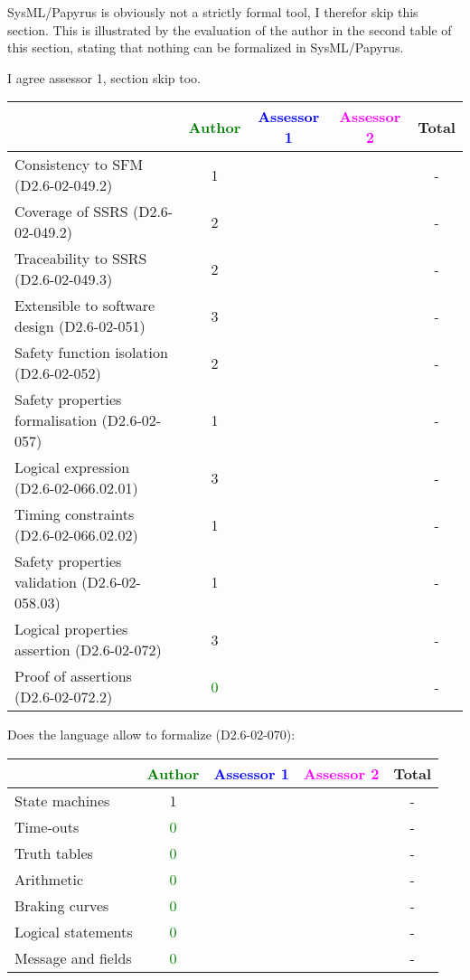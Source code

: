 \begin{assessor1}
SysML/Papyrus is obviously not a strictly formal tool, I therefor skip this section. 
This is illustrated by the evaluation of the author in the second table of this section, stating that nothing can be formalized in SysML/Papyrus. 
\end{assessor1}


\begin{assessor2}
I agree assessor 1, section skip too.
\end{assessor2}

\begin{tabular}{|l | c | c | c | c|}
\hline
& \textcolor{green}{Author} & \textcolor{blue}{Assessor 1} & \textcolor{magenta}{Assessor 2} & Total \\
\hline
Consistency to SFM (D2.6-02-049.2) & 1     & & & - \\
\hline
Coverage of SSRS (D2.6-02-049.2) & 2     & & & - \\
\hline
Traceability to SSRS (D2.6-02-049.3) & 2     && & - \\
\hline
Extensible to software design (D2.6-02-051) & 3     & & & - \\
\hline
Safety function isolation (D2.6-02-052) & 2     & & & - \\
\hline
Safety properties formalisation (D2.6-02-057) & 1     & & & - \\
\hline
Logical expression (D2.6-02-066.02.01) & 3     & & & - \\
\hline
Timing constraints (D2.6-02-066.02.02) & 1     & & & - \\
\hline
Safety properties validation (D2.6-02-058.03) & 1     & & & - \\
\hline
Logical properties assertion (D2.6-02-072) & 3     & & & - \\
\hline
Proof of assertions (D2.6-02-072.2) & \textcolor{green}{0} & & & - \\
\hline
\end{tabular}

Does the language allow to formalize (D2.6-02-070):

\begin{tabular}{|l | c | c | c | c|}
\hline
& \textcolor{green}{Author} & \textcolor{blue}{Assessor 1} & \textcolor{magenta}{Assessor 2} & Total \\
\hline
State machines & 1     & & & - \\
\hline
Time-outs & \textcolor{green}{0} &  & & - \\
\hline
Truth tables & \textcolor{green}{0} & & & - \\
\hline
Arithmetic & \textcolor{green}{0} & & & - \\
\hline
Braking curves & \textcolor{green}{0} & & & - \\
\hline
Logical statements & \textcolor{green}{0} & & & - \\
\hline
Message and fields & \textcolor{green}{0} & & & - \\
\hline
\end{tabular}

